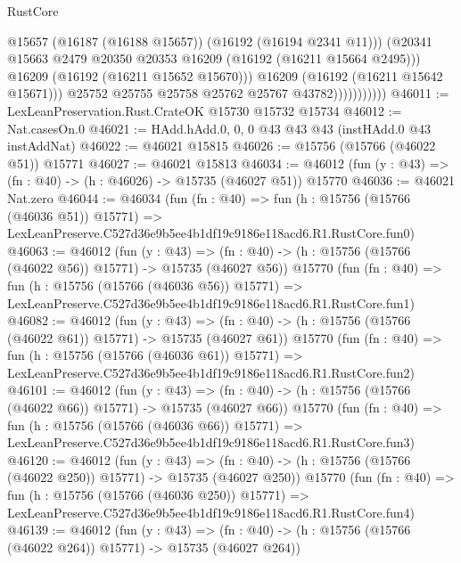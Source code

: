 \begin{lexlean}{RustCore}
\begin{coremodule}
                                @15657
                                (@16187 (@16188 @15657))
                                (@16192 (@16194 @2341 @11)))
                              (@20341
                                @15663
                                @2479
                                @20350
                                @20353
                                @16209
                                (@16192 (@16211 @15664 @2495)))
                              @16209
                              (@16192 (@16211 @15652 @15670)))
                            @16209
                            (@16192 (@16211 @15642 @15671)))
                          @25752
                          @25755
                          @25758
                          @25762
                          @25767
                          @43782)))))))))))
@46011 := LexLeanPreservation.Rust.CrateOK @15730 @15732 @15734
@46012 := Nat.casesOn.{0}
@46021 := HAdd.hAdd.{0, 0, 0} @43 @43 @43 (instHAdd.{0} @43 instAddNat)
@46022 := @46021 @15815
@46026 := @15756 (@15766 (@46022 @51)) @15771
@46027 := @46021 @15813
@46034 := @46012 (fun (y : @43) => (fn : @40) -> (h : @46026) -> @15735 (@46027 @51)) @15770
@46036 := @46021 Nat.zero
@46044 := @46034
    (fun (fn : @40) =>
    fun (h : @15756 (@15766 (@46036 @51)) @15771) =>
    LexLeanPreserve.C527d36e9b5ee4b1df19c9186e118acd6.R1.RustCore.fun0)
@46063 := @46012
    (fun (y : @43) =>
    (fn : @40) -> (h : @15756 (@15766 (@46022 @56)) @15771) -> @15735 (@46027 @56))
    @15770
    (fun (fn : @40) =>
    fun (h : @15756 (@15766 (@46036 @56)) @15771) =>
    LexLeanPreserve.C527d36e9b5ee4b1df19c9186e118acd6.R1.RustCore.fun1)
@46082 := @46012
    (fun (y : @43) =>
    (fn : @40) -> (h : @15756 (@15766 (@46022 @61)) @15771) -> @15735 (@46027 @61))
    @15770
    (fun (fn : @40) =>
    fun (h : @15756 (@15766 (@46036 @61)) @15771) =>
    LexLeanPreserve.C527d36e9b5ee4b1df19c9186e118acd6.R1.RustCore.fun2)
@46101 := @46012
    (fun (y : @43) =>
    (fn : @40) -> (h : @15756 (@15766 (@46022 @66)) @15771) -> @15735 (@46027 @66))
    @15770
    (fun (fn : @40) =>
    fun (h : @15756 (@15766 (@46036 @66)) @15771) =>
    LexLeanPreserve.C527d36e9b5ee4b1df19c9186e118acd6.R1.RustCore.fun3)
@46120 := @46012
    (fun (y : @43) =>
    (fn : @40) -> (h : @15756 (@15766 (@46022 @250)) @15771) -> @15735 (@46027 @250))
    @15770
    (fun (fn : @40) =>
    fun (h : @15756 (@15766 (@46036 @250)) @15771) =>
    LexLeanPreserve.C527d36e9b5ee4b1df19c9186e118acd6.R1.RustCore.fun4)
@46139 := @46012
    (fun (y : @43) =>
    (fn : @40) -> (h : @15756 (@15766 (@46022 @264)) @15771) -> @15735 (@46027 @264))

\end{coremodule}
\end{lexlean}
